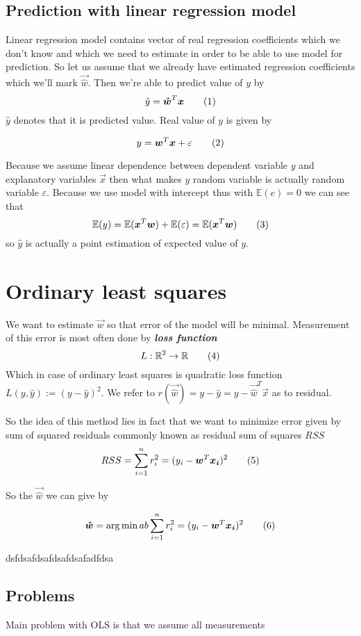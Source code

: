 \subsection{Prediction with linear regression model}
Linear regression model contains vector of real regression coefficients which we don't know and which we need to estimate in order to be able to use model for prediction. So let us assume that we already have estimated regression coefficients which we'll mark $\vec{\hat{w}}$. Then we're able to predict value of $y$ by
\[
    \hat{y} = \vec{\hat{w}}^T\vec{x} \numberthis
\]
$\hat{y}$ denotes that it is predicted value. Real value of $y$ is given by 

\[
    y = \vec{w}^T\vec{x} + \varepsilon \numberthis
\]

Because we assume linear dependence between dependent variable $y$ and explanatory variables $\vec{x}$ then what makes $y$ random variable is actually random variable $\varepsilon$. Because we use model with intercept thus with $\mathbb{E}(e) = 0$ we can see that 
\[
\mathbb{E}(y) =\mathbb{E}(\vec{x}^T\vec{w}) + \mathbb{E}(\varepsilon) = \mathbb{E}(\vec{x}^T\vec{w})
\numberthis
\]
so $\hat{y}$ is actually a point estimation of expected value of $y$.


\section{Ordinary least squares}
We want to estimate $\vec{w}$ so that error of the model will be minimal. Measurement of this error is most often done by \textbf{\textit{loss function}} 
\[ 
L : \mathbb{R}^2 \rightarrow  \mathbb{R} \numberthis
\]
Which in case of ordinary least squares is quadratic loss function $L(y, \hat{y}) := (y - \hat{y})^2$. We refer to $r(\vec{\hat{w}}) = y - \hat{y} = y - \vec{\hat{w}}^T\vec{x} $ as to residual. 

So the idea of this method lies in fact that we want to minimize error given by sum of squared residuals commonly known as residual sum of squares $RSS$
\[
    RSS = \sum\limits_{i=1}^n r_i^2 = (y_i - \vec{w}^T\vec{x_i})^2 \numberthis
\]

So the $\vec{\hat{w}}$ we can give by

\[
    \vec{\hat{w}} =  \argmin{a}{b} \sum\limits_{i=1}^n r_i^2 = (y_i - \vec{w}^T\vec{x_i})^2 \numberthis
\]


dsfdsafdsafdsafdsafadfdsa

\subsection{Problems}
Main problem with OLS is that we assume all measurements
